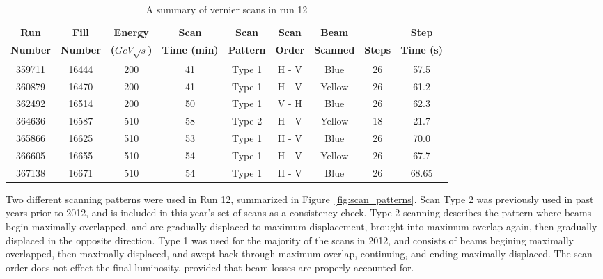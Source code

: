 \begin{table}
\centering
\begin{tabular}{ccccccccc}
\toprule
\textbf{Run}    & \textbf{Fill}   & \textbf{Energy}          & \textbf{Scan}       & \textbf{Scan}    & \textbf{Scan}  & \textbf{Beam}    &                & \textbf{Step}     \\
\textbf{Number} & \textbf{Number} & \textbf{($GeV\sqrt{s}$)} & \textbf{Time (min)} & \textbf{Pattern} & \textbf{Order} & \textbf{Scanned} & \textbf{Steps} & \textbf{Time (s)} \\
\midrule
359711 & 16444 & 200 & 41 & Type 1 & H - V & Blue  & 26 & 57.5 \\
360879 & 16470 & 200 & 41 & Type 1 & H - V & Yellow& 26 & 61.2 \\
362492 & 16514 & 200 & 50 & Type 1 & V - H & Blue  & 26 & 62.3 \\
364636 & 16587 & 510 & 58 & Type 2 & H - V & Yellow& 18 & 21.7 \\
365866 & 16625 & 510 & 53 & Type 1 & H - V & Blue  & 26 & 70.0 \\
366605 & 16655 & 510 & 54 & Type 1 & H - V & Yellow& 26 & 67.7 \\
367138 & 16671 & 510 & 54 & Type 1 & H - V & Blue  & 26 & 68.65\\
\bottomrule
\end{tabular}
\caption{ A summary of vernier scans in run 12 }
\label{tab:global_scan_summary}
\end{table}

Two different scanning patterns were used in Run 12, summarized in
Figure~\ref{fig:scan_patterns}. Scan Type 2 was previously used in past years
prior to 2012, and is included in this year's set of scans as a consistency
check. Type 2 scanning describes the pattern where beams begin maximally
overlapped, and are gradually displaced to maximum displacement, brought into
maximum overlap again, then gradually displaced in the opposite direction.
Type 1 was used for the majority of the scans in 2012, and consists of beams
begining maximally overlapped, then maximally displaced, and swept back through
maximum overlap, continuing, and ending maximally displaced. The scan order
does not effect the final luminosity, provided that beam losses are properly
accounted for.

